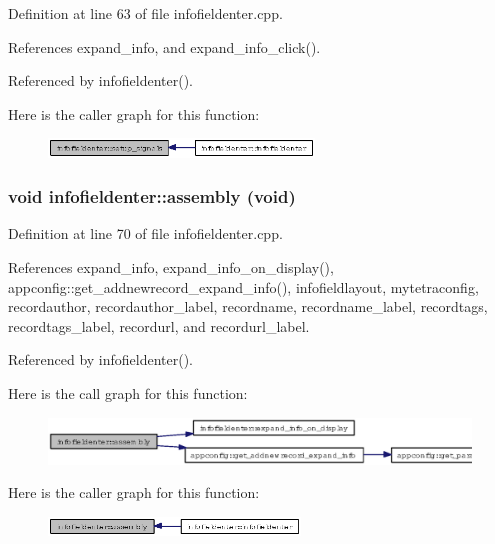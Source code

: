 Definition at line 63 of file infofieldenter.cpp.

References expand\_\-info, and expand\_\-info\_\-click().

Referenced by infofieldenter().

Here is the caller graph for this function:\begin{figure}[H]
\begin{center}
\leavevmode
\includegraphics[width=200pt]{classinfofieldenter_6d4a65c882986cfaa951680c354e0ba7_icgraph}
\end{center}
\end{figure}
\subsubsection{\setlength{\rightskip}{0pt plus 5cm}void infofieldenter::assembly (void)\hspace{0.3cm}{\tt  [private]}}\label{classinfofieldenter_22f8772335566084852d85bcc0bf8963}




Definition at line 70 of file infofieldenter.cpp.

References expand\_\-info, expand\_\-info\_\-on\_\-display(), appconfig::get\_\-addnewrecord\_\-expand\_\-info(), infofieldlayout, mytetraconfig, recordauthor, recordauthor\_\-label, recordname, recordname\_\-label, recordtags, recordtags\_\-label, recordurl, and recordurl\_\-label.

Referenced by infofieldenter().

Here is the call graph for this function:\begin{figure}[H]
\begin{center}
\leavevmode
\includegraphics[width=379pt]{classinfofieldenter_22f8772335566084852d85bcc0bf8963_cgraph}
\end{center}
\end{figure}


Here is the caller graph for this function:\begin{figure}[H]
\begin{center}
\leavevmode
\includegraphics[width=190pt]{classinfofieldenter_22f8772335566084852d85bcc0bf8963_icgraph}
\end{center}
\end{figure}
